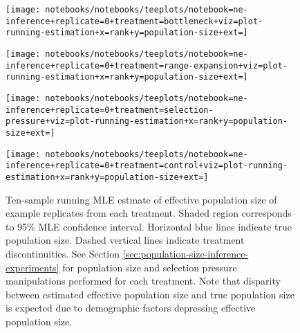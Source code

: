 \begin{sidewaysfigure}
  \centering
  \begin{minipage}{.8\textwidth} %

    \begin{minipage}{0.5\textwidth}
      \centering
      \texttt{[image: notebooks/notebooks/teeplots/notebook=ne-inference+replicate=0+treatment=bottleneck+viz=plot-running-estimation+x=rank+y=population-size+ext=]}
      \label{fig:ne-example-replicates:bottleneck}
    \end{minipage}%
    \begin{minipage}{0.5\textwidth}
      \centering
      \texttt{[image: notebooks/notebooks/teeplots/notebook=ne-inference+replicate=0+treatment=range-expansion+viz=plot-running-estimation+x=rank+y=population-size+ext=]}
      \label{fig:ne-example-replicates:range_expansion}
    \end{minipage}

    \vspace{1cm}

    \begin{minipage}{0.5\textwidth}
      \centering
      \texttt{[image: notebooks/notebooks/teeplots/notebook=ne-inference+replicate=0+treatment=selection-pressure+viz=plot-running-estimation+x=rank+y=population-size+ext=]}
      \label{fig:ne-example-replicates:selection_pressure}
    \end{minipage}%
    \begin{minipage}{0.5\textwidth}
      \centering
      \texttt{[image: notebooks/notebooks/teeplots/notebook=ne-inference+replicate=0+treatment=control+viz=plot-running-estimation+x=rank+y=population-size+ext=]}
      \label{fig:ne-example-replicates:control}
    \end{minipage}

  \end{minipage}
  \hfill %
  \begin{minipage}{.15\textwidth} %
    \caption{Ten-sample running MLE estmate of effective population size of example replicates from  each treatment.
    Shaded region corresponds to 95\% MLE confidence interval.
    Horizontal blue lines indicate true population size.
    Dashed vertical lines indicate treatment discontinuities.
    See Section \ref{sec:population-size-inference-experiments} for population size and selection pressure manipulations performed for each treatment.
    Note that disparity between estimated effective population size and true population size is expected due to demographic factors depressing effective population size.
    }
    \label{fig:ne-example-replicates}
  \end{minipage}

\end{sidewaysfigure}



